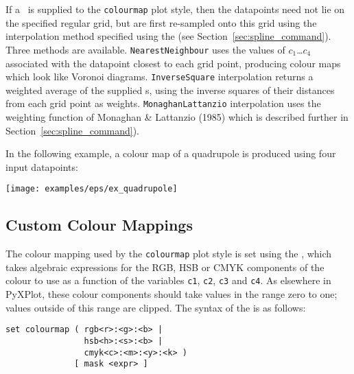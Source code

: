 If a \datafile\ is supplied to the {\tt colourmap} plot style, then the
datapoints need not lie on the specified regular grid, but are first re-sampled
onto this grid using the interpolation method specified using the  (see Section~\ref{sec:spline_command}). Three methods are
available. {\tt NearestNeighbour} uses the values of $c_1$\ldots$c_4$
associated with the datapoint closest to each grid point, producing colour maps
which look like Voronoi diagrams. {\tt InverseSquare} interpolation returns a
weighted average of the supplied \datapoint s, using the inverse squares of
their distances from each grid point as weights. {\tt MonaghanLattanzio}
interpolation uses the weighting function of Monaghan \& Lattanzio (1985) which
is described further in Section~\ref{sec:spline_command}).

In the following example, a colour map of a quadrupole is produced using four
input datapoints:

\newline
{}\newline
{}\newline
{}\newline
{}\newline
{}\newline
{}\newline
{}\newline
{}

\centerline{\texttt{[image: examples/eps/ex\_quadrupole]}}

\subsection{Custom Colour Mappings}

The colour mapping used by the {\tt colourmap} plot style is set using the
, which takes algebraic expressions for the RGB, HSB or
CMYK components of the colour to use as a function of the variables {\tt c1},
{\tt c2}, {\tt c3} and {\tt c4}. As elsewhere in PyXPlot, these colour
components should take values in the range zero to one; values outside of this
range are clipped.  The syntax of the  is as follows:

\begin{verbatim}
set colourmap ( rgb<r>:<g>:<b> |
                hsb<h>:<s>:<b> |
                cmyk<c>:<m>:<y>:<k> )
              [ mask <expr> ]
\end{verbatim}

